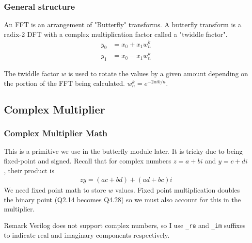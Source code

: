 \documentclass{beamer}
\begin{document}
\begin{frame}
	\frametitle{General structure}
	An FFT is an arrangement of "Butterfly" transforms.
	A butterfly transform is a radix-2 DFT with a complex multiplication factor called
	a "twiddle factor".
	\begin{align*}
		y_0 &= x_0 + x_1 w_n^k \\
		y_1 &= x_0 - x_1 w_n^k
	\end{align*}
	\pause
	\begin{figure}
		\centering
	\end{figure}
	The twiddle factor $w$ is used to rotate the values by a given amount depending on the
	portion of the FFT being calculated. $w_n^k = e^{-2\pi i k / n}$.
\end{frame}

\subsection{Complex Multiplier}
\begin{frame}
	\frametitle{Complex Multiplier Math}
	This is a primitive we use in the butterfly module later. It is tricky
	due to being fixed-point and signed. \pause Recall that for complex
	numbers $z = a+bi$ and $y = c + di$, their product is
	\begin{align*}
		z y = (ac + bd) + (ad + bc)i
	\end{align*}
	\pause
	We need fixed point math to store $w$ values. Fixed point multiplication doubles
	the binary point (Q2.14 becomes Q4.28) so we must also account for this in the multiplier.

	\begin{block}{Remark}
		Verilog does not support complex numbers, so I use \texttt{\_re} and
		\texttt{\_im} suffixes to indicate real and imaginary components 
		respectively.
	\end{block}
\end{frame}
\end{document}
